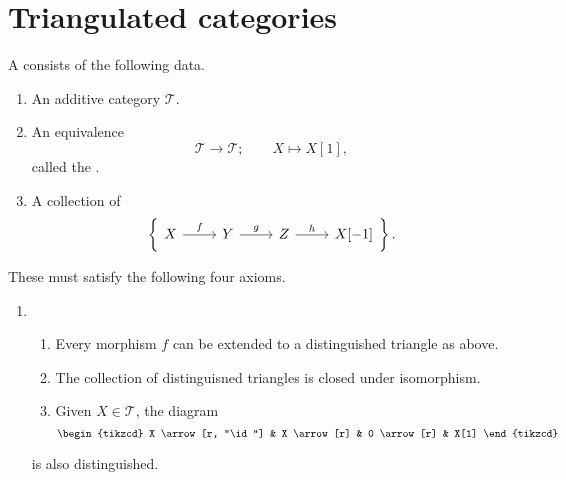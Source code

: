 \documentclass[main.tex]{subfiles}
\begin{document}
\chapter{Triangulated categories}
\label{ch:triangulated_categories}

\begin{definition}
  \label{def:triangulated_category}
  A  consists of the following data.
  \begin{enumerate}
    \item An additive category $\mathcal{T}$.

    \item An equivalence 
      \begin{equation*}
        \mathcal{T} \to \mathcal{T};\qquad X \mapsto X[1],
      \end{equation*}
      called the .

    \item A collection of 
      \begin{equation*}
        \left\{ 
          \begin{tikzcd}
            X
            \arrow[r, "f"]
            & Y
            \arrow[r, "g"]
            & Z
            \arrow[r, "h"]
            & X[-1]
          \end{tikzcd}
        \right\}.
      \end{equation*}
  \end{enumerate}

  These must satisfy the following four axioms.
  \begin{enumerate}[label=(TR\arabic*), leftmargin=*]
    \item 
      \begin{enumerate}
        \item Every morphism $f$ can be extended to a distinguished triangle as above.

        \item The collection of distinguisned triangles is closed under isomorphism.

        \item Given $X \in \mathcal{T}$, the diagram
          \begin{equation*}
            \begin{tikzcd}
              X
              \arrow[r, "\id"]
              & X
              \arrow[r]
              & 0
              \arrow[r]
              & X[1]
            \end{tikzcd}
          \end{equation*}
      \end{enumerate}
      is also distinguished.


\end{enumerate}
\end{definition}
\end{document}
